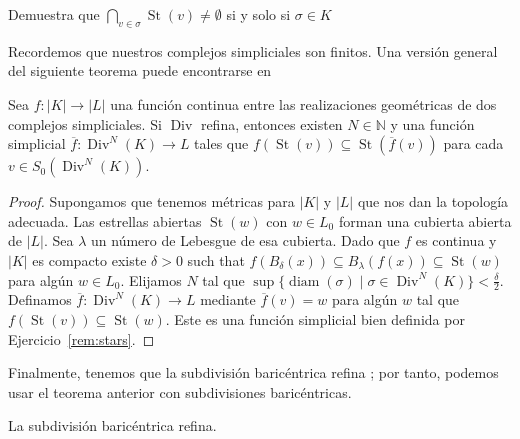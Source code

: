 \documentclass{standalone}
\begin{document}
	\begin{exercise}\label{rem:stars}
		 Demuestra que $\bigcap_{v\in \sigma}\operatorname{St}(v)\neq\emptyset$ si y solo si $\sigma\in K$ 
	\end{exercise}
	Recordemos que nuestros complejos simpliciales son finitos. Una versión general del siguiente teorema puede encontrarse en \cite[Theorem 16.5]{munkres:1984:algebraic:topology} 
	\begin{theorem}\label{thm:simp_app}
		Sea $f\colon|K|\rightarrow|L|$ una función continua entre las realizaciones geométricas de dos complejos simpliciales. Si $\operatorname{Div}$ refina, entonces existen $N\in\mathbb{N}$ y una función simplicial $\overline{f}\colon\operatorname{Div}^{N}(K)\rightarrow L$ tales que $f(\operatorname{St}(v))\subseteq\operatorname{St}(\overline{f}(v))$ para cada $v\in S_{0}(\operatorname{Div}^{N}(K))$.
	\end{theorem}
	
	\begin{proof}
		Supongamos que tenemos métricas para $|K|$ y $|L|$ que nos dan la topología adecuada. Las estrellas abiertas $\operatorname{St}(w)$ con $w\in L_{0}$ forman una cubierta abierta de $|L|$. Sea $\lambda$ un número de Lebesgue de esa cubierta. Dado que $f$ es continua y $|K|$ es compacto existe $\delta>0$ such that $f(B_{\delta}(x))\subseteq B_{\lambda}(f(x))\subseteq \operatorname{St}(w)$ para algún $w\in L_{0}$. Elijamos $N$ tal que $\sup\{\operatorname{diam}(\sigma)\mid\sigma\in\operatorname{Div}^{N}(K)\}<\frac{\delta}{2}$. Definamos $\overline{f}\colon\operatorname{Div}^{N}(K)\rightarrow L$ mediante $\overline{f}(v)=w$ para algún $w$ tal que $f(\operatorname{St}(v))\subseteq \operatorname{St}(w)$. Este es una función simplicial bien definida por Ejercicio~\ref{rem:stars}.
	\end{proof}
	Finalmente, tenemos que la subdivisión baricéntrica refina \cite[Theorem 15.4]{munkres:1984:algebraic:topology}; por tanto, podemos usar el teorema anterior con subdivisiones baricéntricas.
	\begin{proposition}\label{prop:bar_mesh}
		La subdivisión baricéntrica refina.
	\end{proposition}
	
\end{document}
